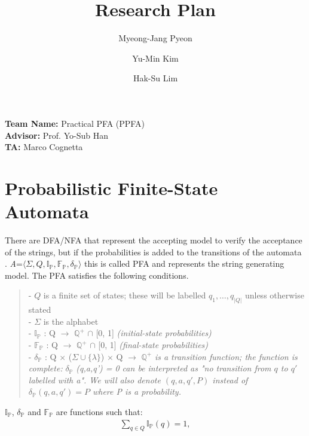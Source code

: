 \documentclass[a4paper]{article}
\title{Research Plan}
\author{Myeong-Jang Pyeon\and Yu-Min Kim\and Hak-Su Lim}
\begin{document}
\maketitle
\begin{center}
{
\large 
\textbf{Team Name:} Practical PFA (PPFA) \\
\textbf{Advisor:} Prof. Yo-Sub Han \\
\textbf{TA:} Marco Cognetta \\
\par 
}
\end{center}

\section{Probabilistic Finite-State Automata}
There are DFA/NFA that represent the accepting model to verify the acceptance of the strings, but if the probabilities is added to the transitions of the automata \cite{vidal2005probabilistic, vidal2005probabilistic2}. 
\textit{A}=$\langle\Sigma,Q,\mathbb{I_P},\mathbb{F_P},\delta_\mathbb{P}\rangle$ this is called PFA and represents the string generating model. The PFA satisfies the following conditions.\\
\begin{quotation}
\noindent
- $Q$ is a finite set of states; these will be labelled $q_1,\dots, q_{|Q|}$ unless otherwise stated\\
- $\Sigma$ is the alphabet\\
- $\mathbb{I_P}$ : Q $\rightarrow$ $\mathbb{Q^+}$ $\cap$ [0, 1] \textit{(initial-state probabilities)}\\
- $\mathbb{F_P}$ : Q $\rightarrow$ $\mathbb{Q^+}$ $\cap$ [0, 1] \textit{(final-state probabilities)}\\
- $\delta_\mathbb{P}$ : Q $\times$ ($\Sigma \cup \{\lambda\}$) $\times$ Q $\rightarrow$ $\mathbb{Q^+}$ \textit{is a transition function; the function is complete:} $\delta_\mathbb{P}$ \textit{(q,a,q') = 0 can be interpreted as "no transition from $q$ to $q'$ labelled with a". We will also denote $(q,a,q',P)$ instead of $\delta_\mathbb{P}(q,a,q') = P$ where P is a probability.}\\ 
\end{quotation}
$\mathbb{I_P}$, $\mathbb{\delta_P}$ and $\mathbb{F_P}$ are functions such that:\\
\begin{align*}
\sum_{q\in\textit{Q}}\mathbb{I_P}(q) = 1, \\
\end{align*}
\end{document}

